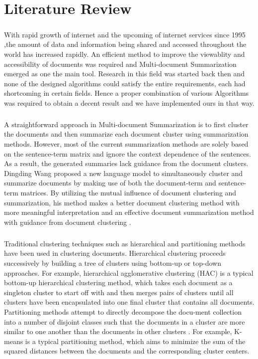 \chapter{Literature Review} 
\paragraph{} With rapid growth of internet and the upcoming of internet services since 1995 ,the amount of data and information being shared and accessed  throughout the world has increased rapidly. An efficient method to improve the viewablity and accessibility of documents was required and Multi-document Summarization emerged as one the main tool. Research in this field was started back then and none of the designed algorithms could satisfy the entire requirements, each had shortcoming in certain fields. Hence a proper combination of various Algorithms was required to obtain a decent result and we have implemented ours in that way. 
 
\paragraph{} A straightforward approach in Multi-document Summarization is to ﬁrst cluster the documents and then summarize each document cluster using summarization methods. However, most of the current summarization methods are solely based on the sentence-term matrix and ignore the context dependence of the sentences. As a result, the generated summaries lack guidance from the document clusters. Dingding Wang    proposed a new language model to simultaneously cluster and summarize documents by making use of both the document-term and sentence- term matrices. By utilizing the mutual inﬂuence of document clustering and summarization, his method makes a better document clustering method with more meaningful interpretation and an effective document summarization method with guidance from document clustering .  
 
\paragraph{} Traditional clustering techniques such as hierarchical and partitioning methods have been used in clustering documents. Hierarchical clustering proceeds successively by building a tree of clusters using bottom-up or top-down approaches. For example, hierarchical agglomerative clustering (HAC) \cite{Duda} is a typical bottom-up hierarchical clustering method, which takes each document as a singleton cluster to start off with and then merges pairs of clusters until all clusters have been encapsulated into one ﬁnal cluster that contains all documents. Partitioning methods attempt to directly decompose the docu-ment collection into a number of disjoint classes such that the documents in a cluster are more similar to one another than the documents in other clusters \cite{HeEtAl}. For example, K-means \cite{Duda} is a typical partitioning method, which aims to minimize the sum of the squared distances between the documents and the corresponding cluster centers. 
 

